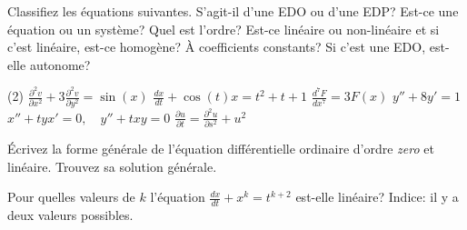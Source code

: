 \setcounter{exercise}{100}

\begin{exercise}
	Classifiez les équations suivantes. S'agit-il d'une EDO ou d'une EDP?  
	Est-ce une équation ou un système?  Quel est l'ordre?  
	Est-ce linéaire ou non-linéaire et si c'est linéaire, est-ce homogène? 
	À coefficients constants?  
	Si c'est une EDO, est-elle autonome?
	\begin{tasks}(2)
	\task $\displaystyle \frac{\partial^2 v}{\partial x^2} + 3 \frac{\partial^2 v}{\partial y^2} = \sin(x)$
	\task $\displaystyle \frac{d x}{dt} + \cos(t) x = t^2+t+1$
	\task $\displaystyle \frac{d^7 F}{dx^7} = 3F(x)$
	\task $\displaystyle y''+8y'=1$
	\task $\displaystyle x''+tyx'=0, \quad y''+txy = 0$
	\task $\displaystyle \frac{\partial u}{\partial t} = \frac{\partial^2 u}{\partial s^2} + u^2$
	\end{tasks}
\end{exercise}

\begin{exercise}
	Écrivez la forme générale de l'équation différentielle ordinaire d'ordre \emph{zero} et linéaire.  
	Trouvez sa solution générale.
\end{exercise}

\begin{exercise}
	Pour quelles valeurs de $k$ l'équation $\frac{dx}{dt}+x^k = t^{k+2}$ est-elle linéaire?  
	Indice: il y a deux valeurs possibles.
\end{exercise}
